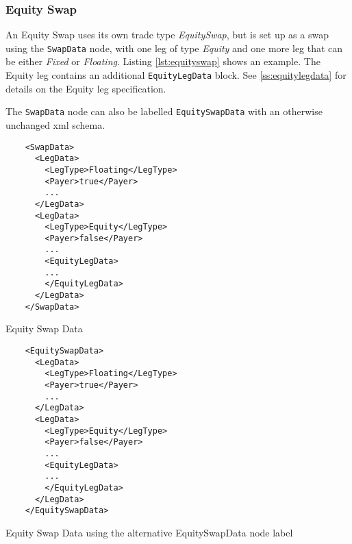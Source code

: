 \subsubsection{Equity Swap}

An Equity Swap uses its own trade type  \emph{EquitySwap}, but is set up as a swap using the {\tt SwapData} node, with one leg of type  \emph{Equity} and one more leg that can be either \emph{Fixed} or  \emph{Floating}. Listing \ref{lst:equityswap} shows an example. The
Equity leg contains an additional {\tt EquityLegData} block. See \ref{ss:equitylegdata} for details on the Equity leg specification.

The {\tt SwapData} node can also be labelled {\tt EquitySwapData} with an otherwise unchanged xml schema.

\begin{listing}[H]
\begin{verbatim}
    <SwapData>
      <LegData>
        <LegType>Floating</LegType>
        <Payer>true</Payer>
        ...
      </LegData>
      <LegData>
        <LegType>Equity</LegType>
        <Payer>false</Payer>
        ...
        <EquityLegData>
        ...
        </EquityLegData>
      </LegData>
    </SwapData>
\end{verbatim}
\caption{Equity Swap Data}
\label{lst:equityswap}
\end{listing}

\begin{listing}[H]
\begin{verbatim}
    <EquitySwapData>
      <LegData>
        <LegType>Floating</LegType>
        <Payer>true</Payer>
        ...
      </LegData>
      <LegData>
        <LegType>Equity</LegType>
        <Payer>false</Payer>
        ...
        <EquityLegData>
        ...
        </EquityLegData>
      </LegData>
    </EquitySwapData>
\end{verbatim}
\caption{Equity Swap Data using the alternative EquitySwapData node label}
\label{lst:equityswap2}
\end{listing}